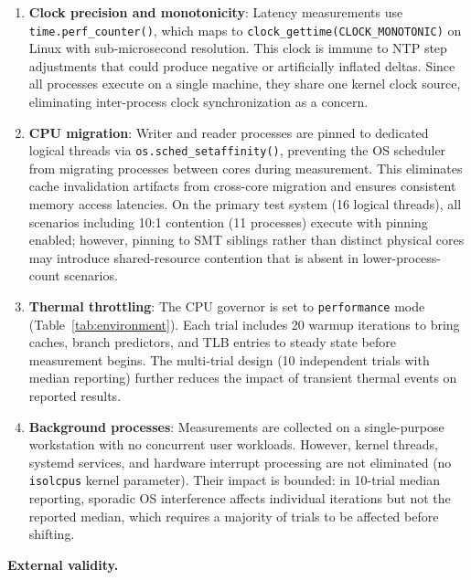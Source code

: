 \begin{enumerate}
    \item \textbf{Clock precision and monotonicity}: Latency measurements use \texttt{time.perf\_\-counter()}, which maps to \texttt{clock\_gettime(\allowbreak{}CLOCK\_MONOTONIC)} on Linux with sub-microsecond resolution. This clock is immune to NTP step adjustments that could produce negative or artificially inflated deltas. Since all processes execute on a single machine, they share one kernel clock source, eliminating inter-process clock synchronization as a concern.

    \item \textbf{CPU migration}: Writer and reader processes are pinned to dedicated logical threads via \texttt{os.sched\_setaffinity()}, preventing the OS scheduler from migrating processes between cores during measurement. This eliminates cache invalidation artifacts from cross-core migration and ensures consistent memory access latencies. On the primary test system (16 logical threads), all scenarios including 10:1 contention (11 processes) execute with pinning enabled; however, pinning to SMT siblings rather than distinct physical cores may introduce shared-resource contention that is absent in lower-process-count scenarios.

    \item \textbf{Thermal throttling}: The CPU governor is set to \texttt{performance} mode (Table~\ref{tab:environment}). Each trial includes 20 warmup iterations to bring caches, branch predictors, and TLB entries to steady state before measurement begins. The multi-trial design (10 independent trials with median reporting) further reduces the impact of transient thermal events on reported results.

    \item \textbf{Background processes}: Measurements are collected on a single-purpose workstation with no concurrent user workloads. However, kernel threads, systemd services, and hardware interrupt processing are not eliminated (no \texttt{isolcpus} kernel parameter). Their impact is bounded: in 10-trial median reporting, sporadic OS interference affects individual iterations but not the reported median, which requires a majority of trials to be affected before shifting.
\end{enumerate}

\textbf{External validity.}

